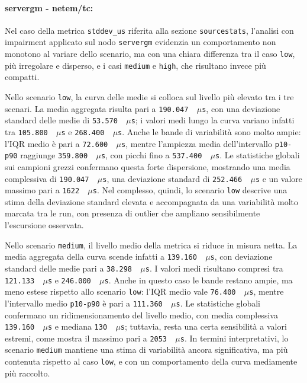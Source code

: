 \paragraph*{servergm - netem/tc:}
Nel caso della metrica \texttt{stddev\_us} riferita alla sezione \texttt{sourcestats},
l'analisi con impairment applicato sul nodo \texttt{servergm} evidenzia un
comportamento non monotono al variare dello scenario, ma con una chiara differenza
tra il caso \texttt{low}, più irregolare e disperso, e i casi \texttt{medium} e \texttt{high},
che risultano invece più compatti.

Nello scenario \texttt{low}, la curva delle medie si colloca sul livello più elevato
tra i tre scenari. La media aggregata risulta pari a \texttt{190.047 \,$\mu$s},
con una deviazione standard delle medie di \texttt{53.570 \,$\mu$s}; i valori
medi lungo la curva variano infatti tra \texttt{105.800 \,$\mu$s} e \texttt{268.400
\,$\mu$s}. Anche le bande di variabilità sono molto ampie: l'IQR medio è pari a
\texttt{72.600 \,$\mu$s}, mentre l'ampiezza media dell'intervallo \texttt{p10-p90}
raggiunge \texttt{359.800 \,$\mu$s}, con picchi fino a \texttt{537.400 \,$\mu$s}.
Le statistiche globali sui campioni grezzi confermano questa forte dispersione,
mostrando una media complessiva di \texttt{190.047 \,$\mu$s}, una deviazione
standard di \texttt{252.466 \,$\mu$s} e un valore massimo pari a \texttt{1622 \,$\mu$s}.
Nel complesso, quindi, lo scenario \texttt{low} descrive una stima della
deviazione standard elevata e accompagnata da una variabilità molto marcata tra
le run, con presenza di outlier che ampliano sensibilmente l'escursione osservata.

Nello scenario \texttt{medium}, il livello medio della metrica si riduce in misura
netta. La media aggregata della curva scende infatti a \texttt{139.160 \,$\mu$s},
con deviazione standard delle medie pari a \texttt{38.298 \,$\mu$s}. I valori
medi risultano compresi tra \texttt{121.133 \,$\mu$s} e \texttt{246.000 \,$\mu$s}.
Anche in questo caso le bande restano ampie, ma meno estese rispetto allo
scenario \texttt{low}: l'IQR medio vale \texttt{76.400 \,$\mu$s}, mentre l'intervallo
medio \texttt{p10-p90} è pari a \texttt{111.360 \,$\mu$s}. Le statistiche globali
confermano un ridimensionamento del livello medio, con media complessiva \texttt{139.160
\,$\mu$s} e mediana \texttt{130 \,$\mu$s}; tuttavia, resta una certa sensibilità
a valori estremi, come mostra il massimo pari a \texttt{2053 \,$\mu$s}. In termini
interpretativi, lo scenario \texttt{medium} mantiene una stima di variabilità ancora
significativa, ma più contenuta rispetto al caso \texttt{low}, e con un
comportamento della curva mediamente più raccolto.

